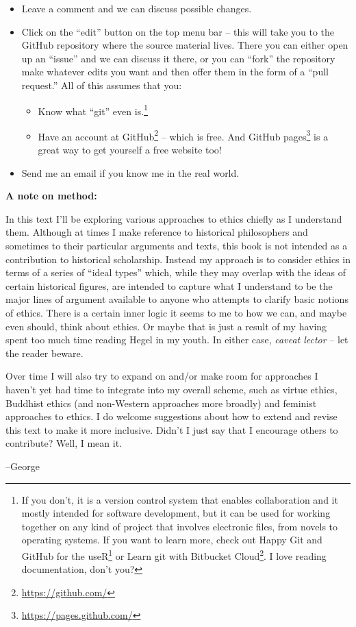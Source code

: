 \documentclass[12pt, openany]{book}
\makeatletter
\providecommand{\tightlist}{%
  \setlength{\itemsep}{0pt}\setlength{\parskip}{0pt}}
\renewcommand{\href}[2]{#2\footnote{\url{#1}}}
\newenvironment{kframe}{%
\medskip{}
\setlength{\fboxsep}{.8em}
 \def\at@end@of@kframe{}%
 \ifinner\ifhmode%
  \def\at@end@of@kframe{\end{minipage}}%
  \begin{minipage}{\columnwidth}%
 \fi\fi%
 \def\FrameCommand##1{\hskip\@totalleftmargin \hskip-\fboxsep
 \colorbox{shadecolor}{##1}\hskip-\fboxsep
     \hskip-\linewidth \hskip-\@totalleftmargin \hskip\columnwidth}%
 \MakeFramed {\advance\hsize-\width
   \@totalleftmargin\z@ \linewidth\hsize
   \@setminipage}}%
 {\par\unskip\endMakeFramed%
 \at@end@of@kframe}
\newenvironment{rmdblock}[1]
  {
  \begin{itemize}
  \renewcommand{\labelitemi}{
    \raisebox{-.7\height}[0pt][0pt]{
      {\setkeys{Gin}{width=3em,keepaspectratio}\texttt{[image: img/\#1]}}
    }
  }
  \setlength{\fboxsep}{1em}
  \begin{kframe}
  \item
  }
  {
  \end{kframe}
  \end{itemize}
  }
\newenvironment{rmdnote}
  {\begin{rmdblock}{note}}
  {\end{rmdblock}}
\makeatother
\begin{document}
\begin{itemize}
\tightlist
\item
  Leave a comment and we can discuss possible changes.
\item
  Click on the ``edit'' button on the top menu bar -- this will take you to the GitHub repository where the source material lives. There you can either open up an ``issue'' and we can discuss it there, or you can ``fork'' the repository make whatever edits you want and then offer them in the form of a ``pull request.'' All of this assumes that you:

  \begin{itemize}
  \tightlist
  \item
    Know what ``git'' even is.\footnote{If you don't, it is a version control system that enables collaboration and it mostly intended for software development, but it can be used for working together on any kind of project that involves electronic files, from novels to operating systems. If you want to learn more, check out \href{https://happygitwithr.com/}{Happy Git and GitHub for the useR} or \href{https://www.atlassian.com/git/tutorials/learn-git-with-bitbucket-cloud}{Learn git with Bitbucket Cloud}. I love reading documentation, don't you?}
  \item
    Have an account at \href{https://github.com/}{GitHub} -- which is free. And \href{https://pages.github.com/}{GitHub pages} is a great way to get yourself a free website too!
  \end{itemize}
\item
  Send me an email if you know me in the real world.
\end{itemize}

\begin{rmdnote}

\textbf{A note on method:}

In this text I'll be exploring various approaches to ethics chiefly as I understand them. Although at times I make reference to historical philosophers and sometimes to their particular arguments and texts, this book is not intended as a contribution to historical scholarship. Instead my approach is to consider ethics in terms of a series of ``ideal types'' which, while they may overlap with the ideas of certain historical figures, are intended to capture what I understand to be the major lines of argument available to anyone who attempts to clarify basic notions of ethics. There is a certain inner logic it seems to me to how we can, and maybe even should, think about ethics. Or maybe that is just a result of my having spent too much time reading Hegel in my youth. In either case, \emph{caveat lector} -- let the reader beware.

Over time I will also try to expand on and/or make room for approaches I haven't yet had time to integrate into my overall scheme, such as virtue ethics, Buddhist ethics (and non-Western approaches more broadly) and feminist approaches to ethics. I do welcome suggestions about how to extend and revise this text to make it more inclusive. Didn't I just say that I encourage others to contribute? Well, I mean it.

--George

\end{rmdnote}
\end{document}
